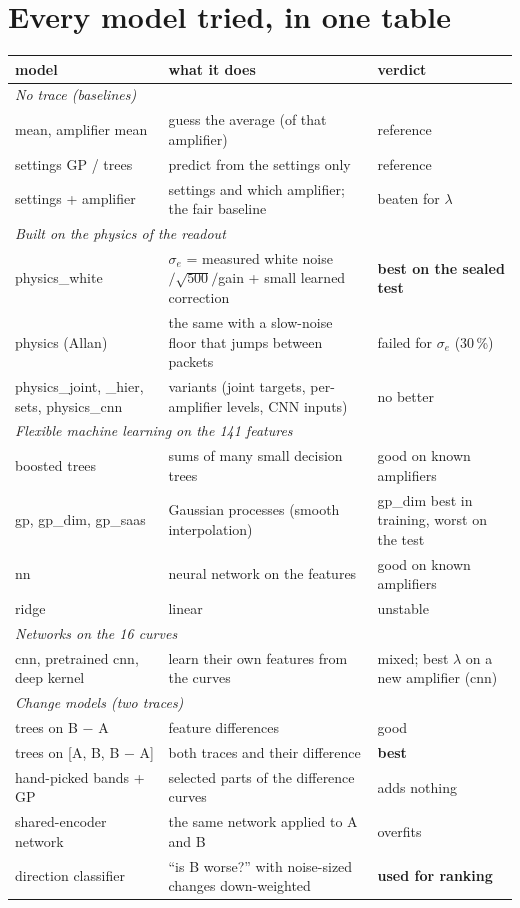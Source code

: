 \documentclass[11pt]{article}
\begin{document}
\section{Every model tried, in one table}
\small
\begin{tabular}{p{3.4cm}p{6.8cm}p{4.8cm}}\toprule
model & what it does & verdict\\\midrule
\multicolumn{3}{l}{\textit{No trace (baselines)}}\\
mean, amplifier mean & guess the average (of that amplifier) & reference\\
settings GP / trees & predict from the settings only & reference\\
settings + amplifier & settings and which amplifier; the fair baseline & beaten for $\lambda$\\[2pt]
\multicolumn{3}{l}{\textit{Built on the physics of the readout}}\\
physics\_white & $\sigma_e$ = measured white noise $/\sqrt{500}/$gain + small learned correction & \textbf{best on the sealed test}\\
physics (Allan) & the same with a slow-noise floor that jumps between packets & failed for $\sigma_e$ (30\,\%)\\
physics\_joint, \_hier, sets, physics\_cnn & variants (joint targets, per-amplifier levels, CNN inputs) & no better\\[2pt]
\multicolumn{3}{l}{\textit{Flexible machine learning on the 141 features}}\\
boosted trees & sums of many small decision trees & good on known amplifiers\\
gp, gp\_dim, gp\_saas & Gaussian processes (smooth interpolation) & gp\_dim best in training, worst on the test\\
nn & neural network on the features & good on known amplifiers\\
ridge & linear & unstable\\[2pt]
\multicolumn{3}{l}{\textit{Networks on the 16 curves}}\\
cnn, pretrained cnn, deep kernel & learn their own features from the curves & mixed; best $\lambda$ on a new amplifier (cnn)\\[2pt]
\multicolumn{3}{l}{\textit{Change models (two traces)}}\\
trees on B $-$ A & feature differences & good\\
trees on [A, B, B $-$ A] & both traces and their difference & \textbf{best}\\
hand-picked bands + GP & selected parts of the difference curves & adds nothing\\
shared-encoder network & the same network applied to A and B & overfits\\
direction classifier & ``is B worse?'' with noise-sized changes down-weighted & \textbf{used for ranking}\\\bottomrule
\end{tabular}
\normalsize
\end{document}
